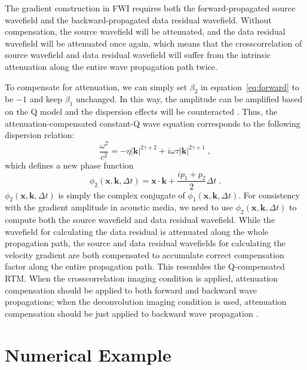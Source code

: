The gradient construction in FWI requires both the forward-propagated source wavefield and the backward-propagated data residual wavefield.
Without compensation, the source wavefield will be attenuated, and the data residual wavefield will be attenuated once again,
which means that the crosscorrelation of source wavefield and data residual wavefield will suffer from the intrinsic attenuation along the entire wave propagation path twice.

To compensate for attenuation, we can simply set $\beta_2$ in equation~\ref{eq:forward} to be $-1$ and keep $\beta_1$ unchanged.
In this way, the amplitude can be amplified based on the Q model and the dispersion effects will be counteracted \cite[]{zhu14b}.
Thus, the attenuation-compensated constant-Q wave equation corresponds to the following dispersion relation:
\begin{equation}
	\label{eq:relation2}
	\frac{\omega^2}{c^2}=-\eta|\mathbf{k}|^{2\gamma+2} + i\omega\tau|\mathbf{k}|^{2\gamma+1} \; ,
\end{equation}
which defines a new phase function \cite[]{sun15}
\begin{equation}
	\label{eq:phase2}
	\phi_2(\mathbf{x},\mathbf{k},\Delta t) = \mathbf{x} \cdot \mathbf{k}+\frac{ip_1 +p_2}{2} \Delta t \; .
\end{equation}
$\phi_2(\mathbf{x},\mathbf{k},\Delta t)$ is simply the complex conjugate of $\phi_1(\mathbf{x},\mathbf{k},\Delta t)$.
For consistency with the gradient amplitude in acoustic media, we need to use $\phi_2(\mathbf{x},\mathbf{k},\Delta t)$ to compute both the
source wavefield and data residual wavefield.
While the wavefield for calculating the data residual is attenuated along the whole propagation path,
the source and data residual wavefields for calculating the velocity gradient are both compensated to accumulate correct compensation factor along the entire propagation path.
This resembles the Q-compensated RTM.
When the crosscorrelation imaging condition is applied, attenuation compensation should be applied to both forward and backward wave propagations;
when the deconvolution imaging condition is used, attenuation compensation should be just applied to backward wave propagation \cite[]{zhu16}.

\section{Numerical Example}

